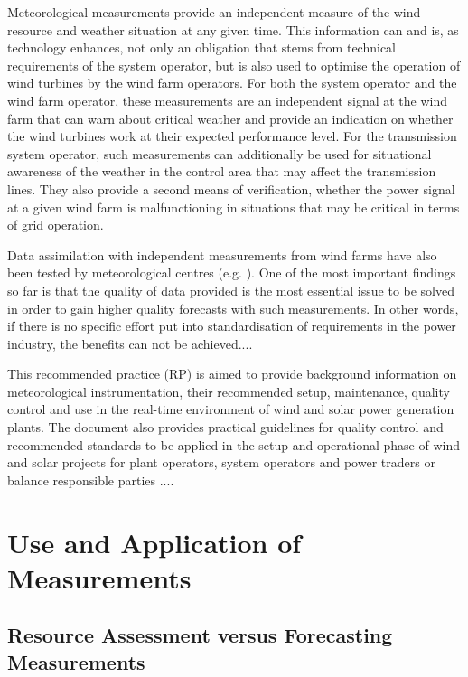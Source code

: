 Meteorological measurements provide an independent measure of the wind resource and weather situation at any given time. This information can and is, as technology enhances, not only an obligation that stems from technical requirements of the system operator, but is also used to optimise the operation of wind turbines by the wind farm operators.
For both the system operator and the wind farm operator, these measurements are an independent signal at the wind farm that can warn about critical weather and provide an indication on whether the wind turbines work at their expected performance level. For the transmission system operator, such measurements can additionally be used for situational awareness of the weather in the control area that may affect the transmission lines. They also provide a second means of verification, whether the power signal at a given wind farm is malfunctioning in situations that may be critical in terms of grid operation.

Data assimilation with independent measurements from wind farms have also been tested by meteorological centres (e.g. \cite{Marquis2012,EWELINE2011}). One of the most important findings so far is that the quality of data provided is the most essential issue to be solved in order to gain higher quality forecasts with such measurements. In other words, if there is no specific effort put into standardisation of requirements in the power industry, the benefits can not be achieved....

This recommended practice (RP) is aimed to provide background information on meteorological instrumentation, their recommended setup, maintenance, quality control and use in the real-time environment of wind and solar power generation plants. The document also provides practical guidelines for quality control and recommended standards to be applied in the setup and operational phase of wind and solar projects for plant operators, system operators and power traders or balance responsible parties .... 


\section{Use and Application of {\color{blue}{(real-time ?)}} Measurements{\color{magenta}{Contributing author: JY, JZ}}}

\subsection{Resource Assessment versus Forecasting Measurements}
